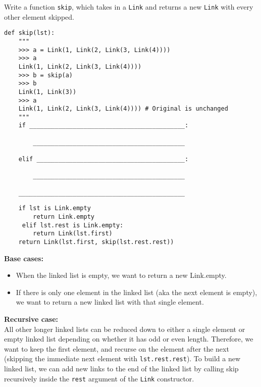 \begin{blocksection}
\question Write a function \texttt{skip}, which takes in a \texttt{Link} and returns a new \texttt{Link} with every other element skipped.

\begin{lstlisting}
def skip(lst):
    """
    >>> a = Link(1, Link(2, Link(3, Link(4))))
    >>> a
    Link(1, Link(2, Link(3, Link(4))))
    >>> b = skip(a)
    >>> b
    Link(1, Link(3))
    >>> a
    Link(1, Link(2, Link(3, Link(4)))) # Original is unchanged
    """
    if ___________________________________________:
		
        __________________________________________
				
    elif _________________________________________:
		
        __________________________________________
				
    ______________________________________________
\end{lstlisting}
\begin{solution}[0.6in]
\begin{lstlisting}
    if lst is Link.empty 
    	return Link.empty
     elif lst.rest is Link.empty:
        return Link(lst.first)
    return Link(lst.first, skip(lst.rest.rest))
\end{lstlisting}
\textbf{Base cases:}
\begin{itemize}
\item When the linked list is empty, we want to return a new Link.empty.
\item If there is only one element in the linked list (aka the next element is empty), we want to return a new linked list with that single element. 
\end{itemize}
\textbf{Recursive case:} \\
All other longer linked lists can be reduced down to either a single element or empty linked list depending on whether it has odd or even length. Therefore, we want to keep the first element, and recurse on the element after the next (skipping the immediate next element with \lstinline{lst.rest.rest}). To build a new linked list, we can add new links to the end of the linked list by calling skip recursively inside the \lstinline{rest} argument of the \lstinline{Link} constructor. 
\end{solution}


\end{blocksection}
